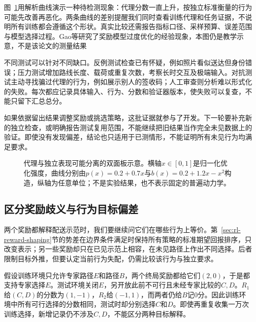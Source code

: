 图~\ref{fig:rl-reward-overoptimization}用解析曲线演示一种待检测现象：代理分数一直上升，按独立标准衡量的行为可能先改善再恶化。两条曲线的差别提醒我们同时查看训练代理和任务证据，不说明所有训练都会遵循这个形状。真实比较还需报告指标口径、采样预算、误差范围与模型选择过程。Gao等研究了奖励模型过度优化的经验现象，本图仍是教学示意，不是该论文的测量结果

不同测试可以针对不同缺口。反例测试检查已有怀疑，例如照片看似送达但身份错误；压力测试增加路线长度、载荷或重复次数，考察长时交互及极端输入。对抗测试主动寻找骗过代理的行为，例如展示别人的签收码；人工审查则分析难以形式化的失败。每次都应记录具体输入、行为、分数和验证器版本，使失败可以复查，不能只留下汇总总分。

如果依据留出结果调整奖励或挑选策略，这批证据就参与了开发。下一轮要补充新的独立检查，或明确报告测试复用范围，不能继续把旧结果当作完全未见数据上的验证。即使没有发现偏差，结论也只适用于已测情形，不能证明所有未见行为均满足要求。

\begin{figure}[htbp]
  \centering
  
  \caption{代理与独立表现可能分离的双面板示意。横轴$x\in[0,1]$是归一化优化强度，曲线分别由$p(x)=0.2+0.7x$与$b(x)=0.2+1.2x-x^2$构造，纵轴为任意单位；不是实验结果，也不表示固定的普遍动力学。}
  \label{fig:rl-reward-overoptimization}
\end{figure}

\subsection{区分奖励歧义与行为目标偏差}
\label{sec:rl-reward-ambiguity}

两个奖励都解释配送示范时，我们要继续问它们在哪些行为上等价。第~\ref{sec:rl-reward-shaping}节的势差在边界条件满足时保持所有策略的标准期望回报排序，只改变表示；另一些奖励却只在已见示范上相容，在未见路径上作出不同选择。后者限制目标外推，但要认定当前行为失配，仍需比较该行为与独立要求。

\begin{example}[示范相容不等于新路径等价]
  \label{ex:rl-reward-ambiguity}
  假设训练环境只允许专家路径$E$和路径$B$，两个终局奖励都给它们$(2,0)$，于是都支持专家选择$E$。测试环境关闭$E$，另开放此前不可行且未经专家比较的$C,D$。$R_1$给$(C,D)$的分数为$(1,-1)$，$R_2$给$(-1,1)$，而两者仍给$B$记0分。因此训练环境中所有可行选择的分数相同，测试时却分别选择$C$和$D$。即使再重复收集一万次训练选择，新增记录仍不涉及$C,D$，不能区分两种目标解释。
\end{example}

